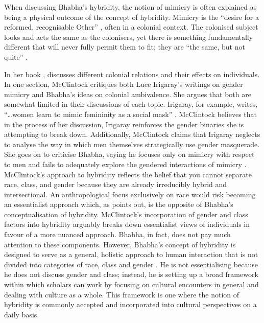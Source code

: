 	When discussing Bhabha’s hybridity, the notion of mimicry is often explained as being a physical outcome of the concept of hybridity. Mimicry is the “desire for a reformed, recognisable Other” \parencite[122]{Bhabha_1994} , often in a colonial context. The colonised subject looks and acts the same as the colonisers, yet there is something fundamentally different that will never fully permit them to fit; they are “the same, but not quite”  \parencite[122]{Bhabha_1994}. 

	In her book , \citeauthor{McClintock_1995} discusses different colonial relations and their effects on individuals. In one section, McClintock critiques both Luce Irigaray’s writings on gender mimicry and Bhabha’s ideas on colonial ambivalence. She argues that both are somewhat limited in their discussions of each topic. Irigaray, for example, writes, “…women learn to mimic femininity as a social mask” \parencite[62]{McClintock_1995}. McClintock believes that in the process of her discussion, Irigaray reinforces the gender binaries she is attempting to break down. Additionally, McClintock claims that Irigaray neglects to analyse the way in which men themselves strategically use gender masquerade.   	She goes on to criticise Bhabha, saying he focuses only on mimicry with respect to men and fails to adequately explore the gendered interactions of mimicry \parencite[62]{McClintock_1995}. McClintock’s approach to hybridity reflects the belief that you cannot separate race, class, and gender because they are already irreducibly hybrid and intersectional. An anthropological focus exclusively on race would risk becoming an essentialist approach which, as \textcite [62]{McClintock_1995} points out, is the opposite of Bhabha’s conceptualisation of hybridity. 
	McClintock’s incorporation of gender and class factors into hybridity arguably breaks down essentialist views of individuals in favour of a more nuanced approach. Bhabha, in fact, does not pay much attention to these components. However, Bhabha’s concept of hybridity is designed to serve as a general, holistic approach to human interaction that is not divided into categories of race, class and gender \parencite{Bhabha_1994}. He is not essentialising because he does not discuss gender and class; instead, he is setting up a broad framework within which scholars can work by focusing on cultural encounters in general and dealing with culture as a whole. This framework is one where the notion of hybridity is commonly accepted and incorporated into cultural perspectives on a daily basis. 
	
